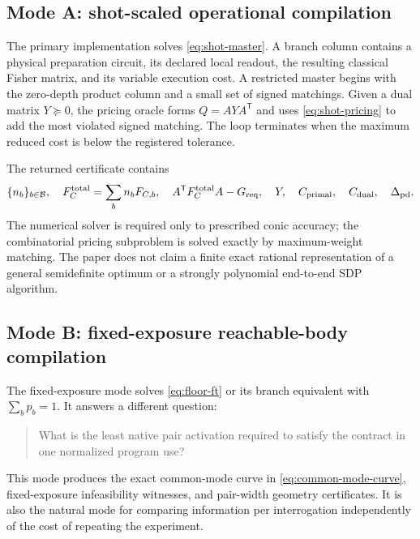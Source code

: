 \documentclass[11pt]{article}
\theoremstyle{definition}
\theoremstyle{remark}
\begin{document}
\subsection{Mode A: shot-scaled operational compilation}
The primary implementation solves \cref{eq:shot-master}. A branch column contains a physical preparation circuit, its declared local readout, the resulting classical Fisher matrix, and its variable execution cost. A restricted master begins with the zero-depth product column and a small set of signed matchings. Given a dual matrix $Y\succeq0$, the pricing oracle forms $Q=AYA^{\mathsf T}$ and uses \cref{eq:shot-pricing} to add the most violated signed matching. The loop terminates when the maximum reduced cost is below the registered tolerance.

The returned certificate contains
\begin{equation}
  \{n_b\}_{b\in\mathcal B},\quad
  F_C^{\rm total}=\sum_b n_bF_{C,b},\quad
  A^{\mathsf T}F_C^{\rm total}A-G_{\rm req},\quad
  Y,\quad
  C_{\rm primal},\quad C_{\rm dual},\quad
  \Delta_{\rm pd}.
\end{equation}
The numerical solver is required only to prescribed conic accuracy; the combinatorial pricing subproblem is solved exactly by maximum-weight matching. The paper does not claim a finite exact rational representation of a general semidefinite optimum or a strongly polynomial end-to-end SDP algorithm.

\subsection{Mode B: fixed-exposure reachable-body compilation}
The fixed-exposure mode solves \cref{eq:floor-ft} or its branch equivalent with $\sum_b p_b=1$. It answers a different question:
\begin{quote}
What is the least native pair activation required to satisfy the contract in one normalized program use?
\end{quote}
This mode produces the exact common-mode curve in \cref{eq:common-mode-curve}, fixed-exposure infeasibility witnesses, and pair-width geometry certificates. It is also the natural mode for comparing information per interrogation independently of the cost of repeating the experiment.
\end{document}
